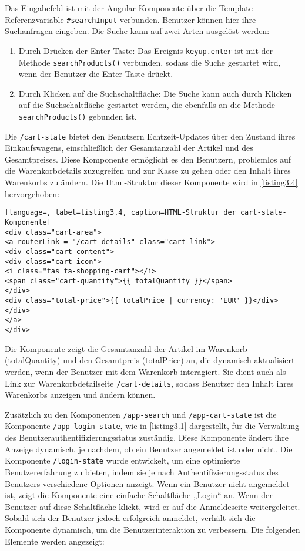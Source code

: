 Das Eingabefeld ist mit der Angular-Komponente über die Template Referenzvariable \verb*|#searchInput| verbunden. Benutzer können hier ihre Suchanfragen eingeben.
Die Suche kann auf zwei Arten ausgelöst werden:

\begin{enumerate}
	\item Durch Drücken der Enter-Taste: Das Ereignis \verb*|keyup.enter| ist mit der Methode \verb*|searchProducts()| verbunden, sodass die Suche gestartet wird, wenn der Benutzer die Enter-Taste drückt.
	\item Durch Klicken auf die Suchschaltfläche: Die Suche kann auch durch Klicken auf die Suchschaltfläche gestartet werden, die ebenfalls an die Methode \verb*|searchProducts()| gebunden ist.
\end{enumerate}

Die \verb*|/cart-state| bietet den Benutzern Echtzeit-Updates über den Zustand ihres Einkaufswagens, einschließlich der Gesamtanzahl der Artikel und des Gesamtpreises. Diese Komponente ermöglicht es den Benutzern, problemlos auf die Warenkorbdetails zuzugreifen und zur Kasse zu gehen oder den Inhalt ihres Warenkorbs zu ändern. Die Html-Struktur dieser Komponente wird in \ref{listing3.4} hervorgehoben: 

\begin{lstlisting}[language=, label=listing3.4, caption=HTML-Struktur der cart-state-Komponente]
<div class="cart-area">
<a routerLink = "/cart-details" class="cart-link">
<div class="cart-content">
<div class="cart-icon">
<i class="fas fa-shopping-cart"></i>
<span class="cart-quantity">{{ totalQuantity }}</span>
</div>
<div class="total-price">{{ totalPrice | currency: 'EUR' }}</div>
</div>
</a>
</div>
\end{lstlisting}

Die Komponente zeigt die Gesamtanzahl der Artikel im Warenkorb (totalQuantity) und den Gesamtpreis (totalPrice) an, die dynamisch aktualisiert werden, wenn der Benutzer mit dem Warenkorb interagiert. Sie dient auch als Link zur Warenkorbdetailseite \verb*|/cart-details|, sodass Benutzer den Inhalt ihres Warenkorbs anzeigen und ändern können.


Zusätzlich zu den Komponenten \verb*|/app-search| und \verb*|/app-cart-state| ist die Komponente \verb*|/app-login-state|, wie in \ref{listing3.1} dargestellt, für die Verwaltung des Benutzerauthentifizierungsstatus zuständig. Diese Komponente ändert ihre Anzeige dynamisch, je nachdem, ob ein Benutzer angemeldet ist oder nicht.
Die Komponente \verb*|/login-state| wurde entwickelt, um eine optimierte Benutzererfahrung zu bieten, indem sie je nach Authentifizierungsstatus des Benutzers verschiedene Optionen anzeigt. Wenn ein Benutzer nicht angemeldet ist, zeigt die Komponente eine einfache Schaltfläche „Login“ an. Wenn der Benutzer auf diese Schaltfläche klickt, wird er auf die Anmeldeseite weitergeleitet.\\
Sobald sich der Benutzer jedoch erfolgreich anmeldet, verhält sich die Komponente dynamisch, um die Benutzerinteraktion zu verbessern. Die folgenden Elemente werden angezeigt:

